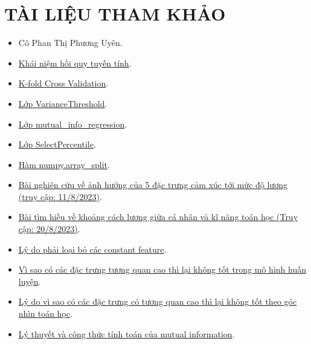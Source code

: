 \documentclass{report}
\begin{document}
\section{TÀI LIỆU THAM KHẢO}
\begin{itemize}
    \item Cô Phan Thị Phương Uyên.
    \item 
    \href{https://en.wikipedia.org/wiki/Linear_regression}{Khái niệm hồi quy tuyến tính}.

    \item
    \href{https://neptune.ai/blog/cross-validation-in-machine-learning-how-to-do-it-right}{K-fold Cross Validation}.

    \item 
    \href{https://scikit-learn.org/stable/modules/generated/sklearn.feature_selection.VarianceThreshold.html}{Lớp VarianceThreshold}.

    \item 
    \href{https://scikit-learn.org/stable/modules/generated/sklearn.feature_selection.mutual_info_regression.html}{Lớp mutual\_info\_regression}.

    \item \href{https://scikit-learn.org/stable/modules/generated/sklearn.feature_selection.SelectPercentile.html}{Lớp SelectPercentile}.

    \item 
    \href{https://numpy.org/doc/stable/reference/generated/numpy.array_split.html#numpy.array_split}{Hàm numpy.array\_split}.

    \item \href{https://kse.ua/kse-research/relationship-between-your-personality-and-your-salary-level/ }{Bài nghiên cứu về ảnh hưởng của 5 đặc trưng cảm xúc tới mức độ lương (truy cập: 11/8/2023)}.

    \item \href{https://www.journals.uchicago.edu/doi/abs/10.1086/298239}{Bài tìm hiều về khoảng cách lương giữa cá nhân và kĩ năng toán học (Truy cập: 20/8/2023)}.

    \item \href{https://sease.io/2021/06/drop-constant-features-a-real-world-ltr-scenario.html#:~:text=Those%20features%20which%20contain%20constant,example%20during%20the%20encoding%20phase}{Lý do phải loại bỏ các constant feature}.
    \item \href{https://datascience.stackexchange.com/questions/24452/in-supervised-learning-why-is-it-bad-to-have-correlated-features}{Vì sao có các đặc trưng tương quan cao thì lại không tốt trong mô hình huấn luyện}.
    \item \href{https://www.quora.com/Why-is-it-important-to-remove-correlated-variables-when-performing-machine-learning-If-2-variables-are-correlated-how-do-you-choose-which-one-to-exclude-from-the-data-set}{Lý do vì sao có các đặc trưng có tương quan cao thì lại không tốt theo góc nhìn toán học}.
    \item \href{https://phamdinhkhanh.github.io/deepai-book/ch_donation/information_theory.html}{Lý thuyết và công thức tính toán của mutual information}.
    

\end{itemize}
\end{document}
